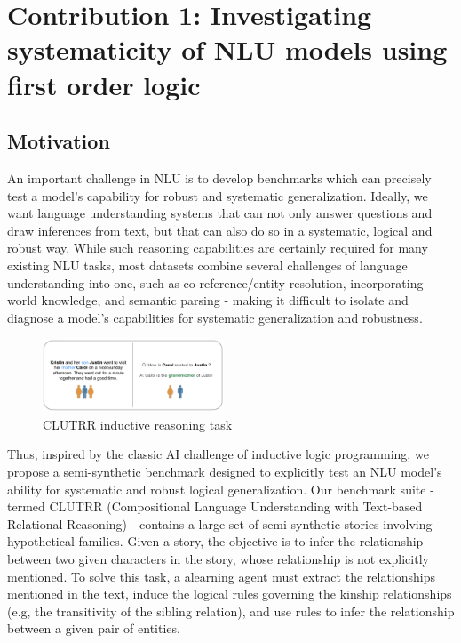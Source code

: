 \documentclass[12pt]{article}
\begin{document}
\section{Contribution 1: Investigating systematicity of NLU models using first order logic}
\label{sec:cont1}

\subsection{Motivation}

An important challenge in NLU is to develop benchmarks which can precisely test a model's capability for robust and systematic generalization. Ideally, we want language understanding systems that can not only answer questions and draw inferences from text, but that can also do so in a systematic, logical and robust way. While such reasoning capabilities are certainly required for many existing NLU tasks, most datasets combine several challenges of language understanding into one, such as co-reference/entity resolution, incorporating world knowledge, and semantic parsing - making it difficult to isolate and diagnose a model's capabilities for systematic generalization and robustness.

\begin{figure}
\begin{center}
  \includegraphics[width=0.48\textwidth]{images/clutrr_text.png}
\end{center}
\caption{CLUTRR inductive reasoning task}
\label{fig:clutrr_data}
\end{figure}



Thus, inspired by the classic AI challenge of inductive logic programming, we propose a semi-synthetic benchmark designed to explicitly test an NLU model's ability for systematic and robust logical generalization. Our benchmark suite - termed CLUTRR (Compositional Language Understanding with Text-based Relational Reasoning) - contains a large set of semi-synthetic stories involving hypothetical families. Given a story, the objective is to infer the relationship between two given characters in the story, whose relationship is not explicitly mentioned. To solve this task, a alearning agent must extract the relationships mentioned in the text, induce the logical rules governing the kinship relationships (e.g, the transitivity of the sibling relation), and use rules to infer the relationship between a given pair of entities.
\end{document}
